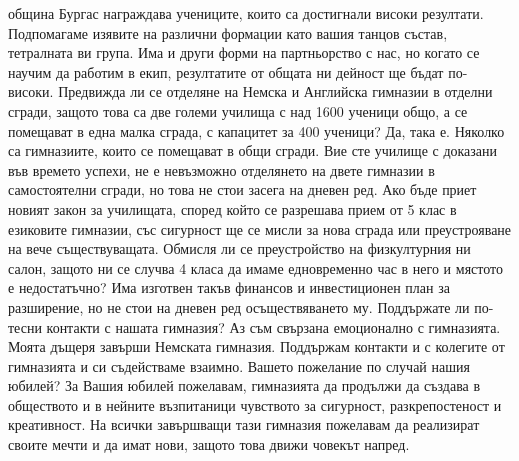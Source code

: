 \begin{multicols}{3}
община Бургас награждава учениците, които са достигнали високи резултати. 
Подпомагаме изявите на различни формации като вашия танцов състав, тетралната ви 
група. Има и други форми на партньорство с нас, но когато се научим да работим в 
екип, резултатите от общата ни дейност ще бъдат по-високи.
Предвижда ли се отделяне на Немска и Английска гимназии в отделни сгради, защото 
това са две големи училища с над 1600 ученици общо, а се помещават в една малка 
сграда, с капацитет за 400 ученици?  
Да, така е. Няколко са гимназиите, които се помещават в общи сгради. Вие сте 
училище с доказани във времето успехи, не е невъзможно отделянето на двете 
гимназии в самостоятелни сгради, но това не стои засега на дневен ред. Ако бъде 
приет новият закон за училищата, според който се разрешава прием от 5 клас  в 
езиковите гимназии, със сигурност ще се мисли  за нова сграда или преустрояване 
на вече съществуващата.
Обмисля ли се преустройство на физкултурния ни салон, защото ни се случва 4 
класа да имаме едновременно час в него и мястото е недостатъчно?
Има изготвен такъв финансов и инвестиционен план за разширение, но не стои на 
дневен ред осъществяването му. 
Поддържате ли по-тесни контакти с нашата гимназия?
Аз съм свързана емоционално с гимназията. Моята дъщеря завърши Немската 
гимназия. Поддържам контакти и с колегите от гимназията и си съдействаме 
взаимно.
Вашето пожелание по случай нашия юбилей?
За Вашия юбилей пожелавам, гимназията да продължи да създава в обществото и в 
нейните възпитаници чувството за сигурност, разкрепостеност и креативност. На 
всички завършващи тази гимназия пожелавам да реализират своите мечти и да имат 
нови, защото това движи човекът напред.
\closearticle
\end{multicols}
